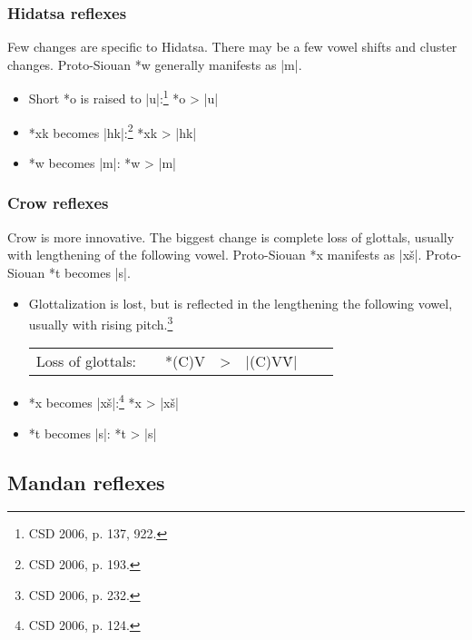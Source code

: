\documentclass[output=paper]{LSP/langsci}
\begin{document}
\subsubsection{Hidatsa reflexes}

Few changes are specific to Hidatsa.  There may be a few vowel shifts and cluster changes.  Proto-Siouan *w generally manifests as |m|.

\begin{itemize}
\item Short *o is raised to |u|:\footnote{CSD 2006, p. 137, 922.}	 \hspace{1em} *o	>	|u|
\item *xk becomes |hk|:\footnote{CSD 2006, p. 193.} \hspace{3.2em}  *xk	>	|hk|
\item *w becomes |m|: \hspace{4.1em} *w	>	|m|
\end{itemize}

\subsubsection{Crow reflexes}

Crow is more innovative.  The biggest change is complete loss of glottals, usually with lengthening of the following vowel.  Proto-Siouan *x manifests as |x\v{s}|.  Proto-Siouan *t becomes |s|.

\begin{itemize}
\item Glottalization is lost, but is reflected in the lengthening the following vowel, usually with rising pitch.\footnote{CSD 2006, p. 232.}

\begin{center}
\begin{tabular}[t]{c c c c c c c}
Loss of glottals:	 & & *(C)\textsuperscript{\textipa{P}}V & > & |(C)V\'V|
\end{tabular}
\end{center}

\item *x becomes |x\v{s}|:\footnote{	CSD 2006, p. 124.}	\hspace{1em} *x	>	|x\v{s}|
\item *t becomes |s|: \hspace{2em}  *t	>	|s|
\end{itemize}

\subsection{Mandan reflexes}
\end{document}
